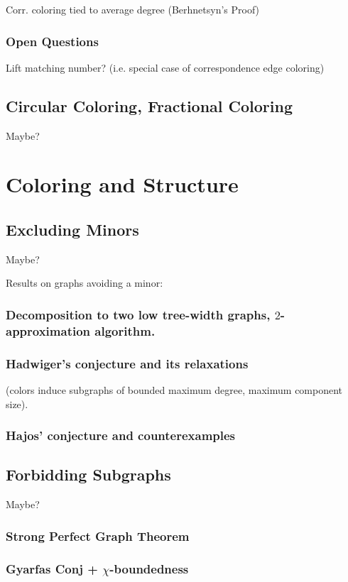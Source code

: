 \documentclass[12pt,twoside,openright,a4paper]{book}
\begin{document}
Corr. coloring tied to average degree (Berhnetsyn's Proof)

\section{Open Questions}

Lift matching number? (i.e. special case of correspondence edge coloring)

\chapter{Circular Coloring, Fractional Coloring}

Maybe?

\part{Coloring and Structure}

\chapter{Excluding Minors}

Maybe?

Results on graphs avoiding a minor:


\section{Decomposition to two low tree-width graphs, $2$-approximation algorithm.}
\section{Hadwiger's conjecture and its relaxations}
(colors induce subgraphs of bounded maximum degree, maximum component size).
\section{Hajos' conjecture and counterexamples}

\chapter{Forbidding Subgraphs}

Maybe?

\section{Strong Perfect Graph Theorem}
\section{Gyarfas Conj + $\chi$-boundedness}
\end{document}
